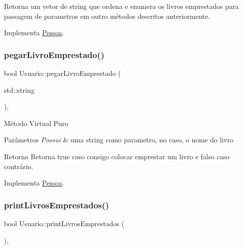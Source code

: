 \begin{DoxyReturn}{Retorna}
um vetor de string que ordena e enumera os livros emprestados para passagem de parametros em outro métodos descritos anteriormente. 
\end{DoxyReturn}


Implementa \mbox{\hyperlink{class_pessoa_a9f6907ce8a5ef6fc942f0fa0d1f27854}{Pessoa}}.

\mbox{\label{class_usuario_a4466655ca0f573b8e46b2d62d16acb48}} 
\subsubsection{\texorpdfstring{pegarLivroEmprestado()}{pegarLivroEmprestado()}}
{\footnotesize\ttfamily bool Usuario\+::pegar\+Livro\+Emprestado (\begin{DoxyParamCaption}\item[{std\+::string}]{ }\end{DoxyParamCaption})\hspace{0.3cm}{\ttfamily [override]}, {\ttfamily [virtual]}}

Método Virtual Puro 
\begin{DoxyParams}{Parâmetros}
{\em Possui} & uma string como parametro, no caso, o nome do livro \\
\hline
\end{DoxyParams}
\begin{DoxyReturn}{Retorna}
Retorna true caso consigo colocar emprestar um livro e falso caso contrário. 
\end{DoxyReturn}


Implementa \mbox{\hyperlink{class_pessoa_aca2ded64e7520692148ee84d923c5c28}{Pessoa}}.

\mbox{\label{class_usuario_ae654f1ccecd9db7278b891f72c13c025}} 
\subsubsection{\texorpdfstring{printLivrosEmprestados()}{printLivrosEmprestados()}}
{\footnotesize\ttfamily bool Usuario\+::print\+Livros\+Emprestados (\begin{DoxyParamCaption}{ }\end{DoxyParamCaption})\hspace{0.3cm}{\ttfamily [override]}, {\ttfamily [virtual]}}

